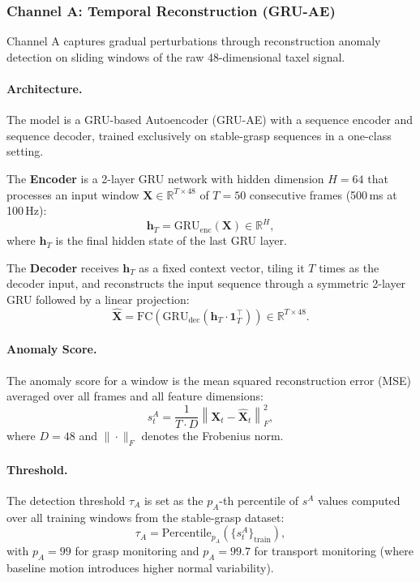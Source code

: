 \documentclass[pdflatex,sn-mathphys-num]{sn-jnl}%
\theoremstyle{thmstyleone}%
\theoremstyle{thmstyletwo}%
\theoremstyle{thmstylethree}%
\begin{document}
\subsubsection{Channel A: Temporal Reconstruction (GRU-AE)}
\label{sec:channel_a}

Channel A captures gradual perturbations through reconstruction anomaly detection on sliding windows of the raw 48-dimensional taxel signal.

\paragraph{Architecture.}
The model is a GRU-based Autoencoder (GRU-AE) with a sequence encoder and sequence decoder, trained exclusively on stable-grasp sequences in a one-class setting.

The \textbf{Encoder} is a 2-layer GRU network with hidden dimension $H = 64$ that processes an input window $\mathbf{X} \in \mathbb{R}^{T \times 48}$ of $T = 50$ consecutive frames (500\,ms at 100\,Hz):
\begin{equation}
    \mathbf{h}_T = \mathrm{GRU}_{\mathrm{enc}}(\mathbf{X}) \in \mathbb{R}^{H},
    \label{eq:encoder}
\end{equation}
where $\mathbf{h}_T$ is the final hidden state of the last GRU layer.

The \textbf{Decoder} receives $\mathbf{h}_T$ as a fixed context vector, tiling it $T$ times as the decoder input, and reconstructs the input sequence through a symmetric 2-layer GRU followed by a linear projection:
\begin{equation}
    \hat{\mathbf{X}} = \mathrm{FC}\!\left(\mathrm{GRU}_{\mathrm{dec}}\!\left(\mathbf{h}_T \cdot \mathbf{1}_{T}^\top\right)\right) \in \mathbb{R}^{T \times 48}.
    \label{eq:decoder}
\end{equation}

\paragraph{Anomaly Score.}
The anomaly score for a window is the mean squared reconstruction error (MSE) averaged over all frames and all feature dimensions:
\begin{equation}
    s^A_t = \frac{1}{T \cdot D} \left\| \mathbf{X}_t - \hat{\mathbf{X}}_t \right\|_F^2,
    \label{eq:score_a}
\end{equation}
where $D = 48$ and $\|\cdot\|_F$ denotes the Frobenius norm.

\paragraph{Threshold.}
The detection threshold $\tau_A$ is set as the $p_A$-th percentile of $s^A$ values computed over all training windows from the stable-grasp dataset:
\begin{equation}
    \tau_A = \mathrm{Percentile}_{p_A}\!\left(\{s^A_t\}_{\text{train}}\right),
    \label{eq:threshold_a}
\end{equation}
with $p_A = 99$ for grasp monitoring and $p_A = 99.7$ for transport monitoring (where baseline motion introduces higher normal variability).
\end{document}
